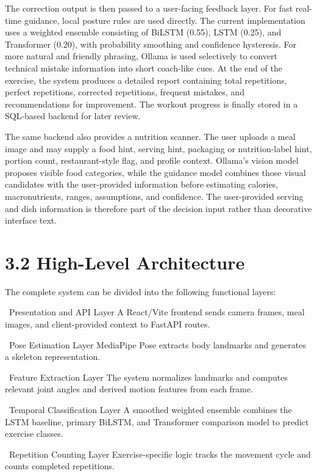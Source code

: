 \documentclass[12pt,a4paper]{report}
\begin{document}
The correction output is then passed to a user-facing feedback layer. For fast real-time guidance, local posture rules are used directly. The current implementation uses a weighted ensemble consisting of BiLSTM (0.55), LSTM (0.25), and Transformer (0.20), with probability smoothing and confidence hysteresis. For more natural and friendly phrasing, Ollama is used selectively to convert technical mistake information into short coach-like cues. At the end of the exercise, the system produces a detailed report containing total repetitions, perfect repetitions, corrected repetitions, frequent mistakes, and recommendations for improvement. The workout progress is finally stored in a SQL-based backend for later review.

The same backend also provides a nutrition scanner. The user uploads a meal image and may supply a food hint, serving hint, packaging or nutrition-label hint, portion count, restaurant-style flag, and profile context. Ollama's vision model proposes visible food categories, while the guidance model combines those visual candidates with the user-provided information before estimating calories, macronutrients, ranges, assumptions, and confidence. The user-provided serving and dish information is therefore part of the decision input rather than decorative interface text.

\section{3.2 High-Level Architecture}
The complete system can be divided into the following functional layers:

\noindent\textbullet\ Presentation and API Layer  
   A React/Vite frontend sends camera frames, meal images, and client-provided context to FastAPI routes.

\noindent\textbullet\ Pose Estimation Layer  
   MediaPipe Pose extracts body landmarks and generates a skeleton representation.

\noindent\textbullet\ Feature Extraction Layer  
   The system normalizes landmarks and computes relevant joint angles and derived motion features from each frame.

\noindent\textbullet\ Temporal Classification Layer  
   A smoothed weighted ensemble combines the LSTM baseline, primary BiLSTM, and Transformer comparison model to predict exercise classes.

\noindent\textbullet\ Repetition Counting Layer  
   Exercise-specific logic tracks the movement cycle and counts completed repetitions.
\end{document}
